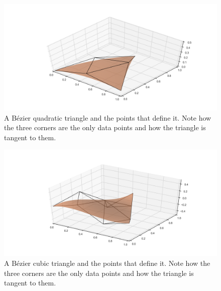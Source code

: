 \begin{figure}
\centering
\includegraphics[width=\linewidth]{figs/quadratictri}
\caption{A B\'ezier quadratic triangle and the points that define it.
Note how the three corners are the only data points and how the triangle is tangent to them.}%
\label{fig:quadratictri}
\end{figure}

\begin{figure}
\centering
\includegraphics[width=\linewidth]{figs/cubictri}
\caption{A B\'ezier cubic triangle and the points that define it.
Note how the three corners are the only data points and how the triangle is tangent to them.}%
\label{fig:cubictri}
\end{figure}

